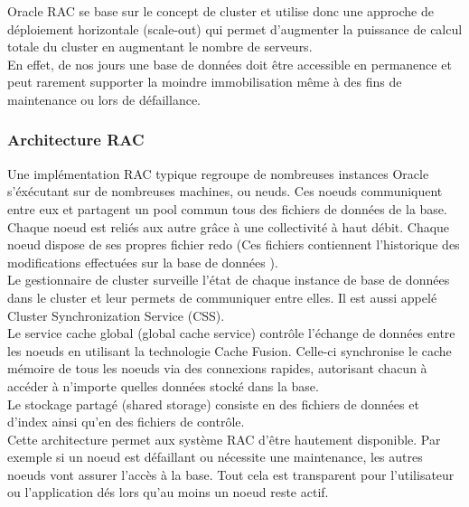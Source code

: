 \documentclass[12pt]{report}
\begin{document}
Oracle RAC se base sur le concept de cluster et utilise donc une approche de
déploiement horizontale (scale-out) qui permet d’augmenter la puissance de
calcul totale du cluster en augmentant le nombre de serveurs. \\

En effet, de nos jours une base de données doit être accessible en permanence et
peut rarement supporter la moindre immobilisation même à des fins de maintenance
ou lors de défaillance. \\

\subsubsection{Architecture RAC}

Une implémentation RAC typique regroupe de nombreuses instances Oracle
s'éxécutant sur de nombreuses machines, ou neuds. Ces noeuds communiquent entre
eux et partagent un pool commun tous des fichiers de données de la base. \\

	Chaque noeud est reliés aux autre grâce à une collectivité à haut débit.
Chaque noeud dispose de ses propres fichier redo (Ces fichiers contiennent
l'historique des modifications effectuées sur la base de données ).\\

Le gestionnaire de cluster surveille l'état de chaque instance de base de
données dans le cluster et leur permets de communiquer entre elles. Il est aussi
appelé Cluster Synchronization Service (CSS).\\

Le service cache global (global cache service) contrôle l'échange de données
entre les noeuds en utilisant la technologie Cache Fusion. Celle-ci synchronise
le cache mémoire de tous les noeuds via des connexions rapides, autorisant
chacun à accéder à n'importe quelles données stocké dans la base.\\

Le stockage partagé (shared storage) consiste en des fichiers de données et
d'index ainsi qu'en des fichiers de contrôle.\\

Cette architecture permet aux système RAC d'être hautement disponible.
Par exemple si un noeud est défaillant ou nécessite une maintenance, les autres
noeuds vont assurer l'accès à la base. Tout cela est transparent pour
l'utilisateur ou l'application dés lors qu'au moins un noeud reste actif. \\
\end{document}
